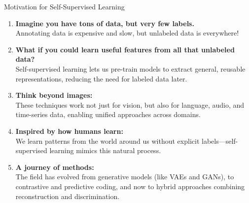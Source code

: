 \begin{frame}[allowframebreaks]{}
    \begin{figure}
        \centering
    \end{figure}
\end{frame}

\begin{frame}{Motivation for Self-Supervised Learning}
    \begin{enumerate}
        \setlength{\itemsep}{-0.5em}
        \item \textbf{Imagine you have tons of data, but very few labels.}\\
        Annotating data is expensive and slow, but unlabeled data is everywhere!\\[0.5em]
        \item<2-> \textbf{What if you could learn useful features from all that unlabeled data?}\\
        Self-supervised learning lets us pre-train models to extract general, reusable representations, reducing the need for labeled data later.\\[0.5em]
        \item<3-> \textbf{Think beyond images:}\\
        These techniques work not just for vision, but also for language, audio, and time-series data, enabling unified approaches across domains.\\[0.5em]
        \item<4-> \textbf{Inspired by how humans learn:}\\
        We learn patterns from the world around us without explicit labels—self-supervised learning mimics this natural process.\\[0.5em]
        \item<5-> \textbf{A journey of methods:}\\
        The field has evolved from generative models (like VAEs and GANs), to contrastive and predictive coding, and now to hybrid approaches combining reconstruction and discrimination.
    \end{enumerate}

\end{frame}

